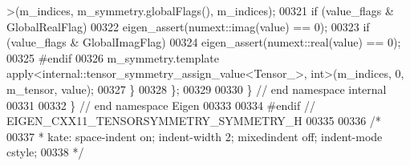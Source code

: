 \begin{DoxyCode}
      >(m\_indices, m\_symmetry.globalFlags(), m\_indices);
00321         \textcolor{keywordflow}{if} (value\_flags & GlobalRealFlag)
00322           eigen\_assert(numext::imag(value) == 0);
00323         \textcolor{keywordflow}{if} (value\_flags & GlobalImagFlag)
00324           eigen\_assert(numext::real(value) == 0);
00325 \textcolor{preprocessor}{      #endif}
00326       m\_symmetry.template apply<internal::tensor\_symmetry\_assign\_value<Tensor\_>, \textcolor{keywordtype}{int}>(m\_indices, 0, 
      m\_tensor, value);
00327     \}
00328 \};
00329 
00330 \} \textcolor{comment}{// end namespace internal}
00331 
00332 \} \textcolor{comment}{// end namespace Eigen}
00333 
00334 \textcolor{preprocessor}{#endif // EIGEN\_CXX11\_TENSORSYMMETRY\_SYMMETRY\_H}
00335 
00336 \textcolor{comment}{/*}
00337 \textcolor{comment}{ * kate: space-indent on; indent-width 2; mixedindent off; indent-mode cstyle;}
00338 \textcolor{comment}{ */}
\end{DoxyCode}
